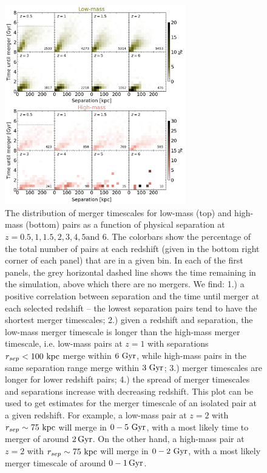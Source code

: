 \documentclass[twocolumn,linenumbers]{aastex631}
\begin{document}
\begin{figure}[htb!]
    \begin{center}
    \includegraphics[width=0.7\textwidth]{plots/bet-on-it/8_2Dhist.png}
    \caption{The distribution of merger timescales for low-mass (top) and high-mass (bottom) pairs as a function of physical separation at $z=0.5,1,1.5,2,3,4,5\mbox{and }6$. 
    The colorbars show the percentage of the total number of pairs at each redshift (given in the bottom right corner of each panel) that are in a given bin.
    In each of the first panels, the grey horizontal dashed line shows the time remaining in the simulation, above which there are no mergers. 
    We find:
    1.) a positive correlation between separation and the time until merger at each selected redshift -- the lowest separation pairs tend to have the shortest merger timescales; 
    2.) given a redshift and separation, the low-mass merger timescale is longer than the high-mass merger timescale, i.e. low-mass pairs at $z=1$ with separations $r_{sep}<100\,\mathrm{\,kpc}$ merge within $6\, \mathrm{\,Gyr}$, while high-mass pairs in the same separation range merge within $3\, \mathrm{\,Gyr}$; 
    3.) merger timescales are longer for lower redshift pairs; 
    4.) the spread of merger timescales and separations increase with decreasing redshift.
    This plot can be used to get estimates for the merger timescale of an isolated pair at a given redshift. 
    For example, a low-mass pair at $z=2$ with $r_{sep}\sim 75\,\mathrm{\,kpc}$ will merge in $0-5\,\mathrm{\,Gyr}$, with a most likely time to merger of around $2\mathrm{\,Gyr}$.
    On the other hand, a high-mass pair at $z=2$ with $r_{sep}\sim 75\,\mathrm{\,kpc}$ will merge in $0-2\,\mathrm{\,Gyr}$, with a most likely merger timescale of around $0-1\mathrm{\,Gyr}$.
    }
    \label{fig:2dhist}
    \end{center}
\end{figure}
\end{document}
